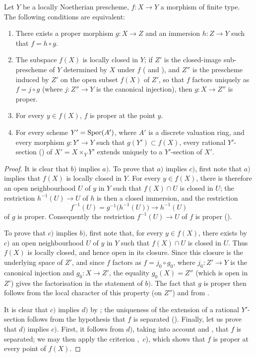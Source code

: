 \begin{corollary}[15.7.6]
\label{IV.15.7.6}
Let $Y$ be a locally Noetherian prescheme, $f:X\to Y$ a morphism of finite type.
The following conditions are equivalent:
\begin{enumerate}[label=\emph{\alph*)}]
  \item There exists a proper morphism $g:X\to Z$ and an immersion $h:Z\to Y$ such that $f=h\circ g$.
  \item The subspace $f(X)$ is locally closed in $Y$; if $Z'$ is the closed-image sub-prescheme of $Y$ determined by $X$ under $f$ ( and ), and $Z''$ is the prescheme induced by $Z'$ on the open subset $f(X)$ of $Z'$, so that $f$ factors uniquely as $f=j\circ g$ (where $j:Z''\to Y$ is the canonical injection), then $g:X\to Z''$ is proper.
  \item For every $y\in f(X)$, $f$ is proper at the point $y$.
  \item For every scheme $Y'=\operatorname{Spec}(A')$, where $A'$ is a discrete valuation ring, and every morphism $g:Y'\to Y$ such that $g(Y')\subset f(X)$, every rational $Y'$-section () of $X'=X\times_Y Y'$ extends uniquely to a $Y'$-section of $X'$.
\end{enumerate}
\end{corollary}

\begin{proof}
It is clear that $b)$ implies $a)$. To prove that $a)$ implies $c)$, first note that $a)$ implies that $f(X)$ is locally closed in $Y$. For every $y\in f(X)$, there is therefore an open neighbourhood $U$
of $y$ in $Y$ such that $f(X)\cap U$ is closed in $U$; the restriction $h^{-1}(U)\to U$ of $h$ is then a closed immersion, and the restriction
\[
  f^{-1}(U)=g^{-1}\bigl(h^{-1}(U)\bigr)\longrightarrow h^{-1}(U)
\]
of $g$ is proper. Consequently the restriction $f^{-1}(U)\to U$ of $f$ is proper ().

To prove that $c)$ implies $b)$, first note that, for every $y\in f(X)$, there exists by $c)$ an open neighbourhood $U$ of $y$ in $Y$ such that $f(X)\cap U$ is closed in $U$. Thus $f(X)$ is locally closed, and hence open in its closure. Since this closure is the underlying space of $Z'$, and since $f$ factors as $f=j_0\circ g_0$, where $j_0:Z'\to Y$ is the canonical injection and $g_0:X\to Z'$, the equality $g_0(X)=Z''$ (which is open in $Z'$) gives the factorisation in the statement of $b)$. The fact that $g$ is proper then follows from the local character of this property (on $Z''$) and from .

It is clear that $c)$ implies $d)$ by ; the uniqueness of the extension of a rational $Y'$-section follows from the hypothesis that $f$ is separated ().
Finally, let us prove that $d)$ implies $c)$. First, it follows from $d)$, taking into account  and , that $f$ is separated; we may then apply the criterion ,~$c$), which shows that $f$ is proper at every point of $f(X)$.
\end{proof}

